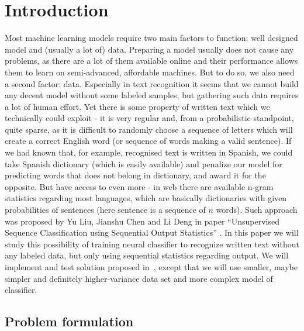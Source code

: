 \documentclass[shortabstract,lic,english]{iithesis}
\author         {Grzegorz Ciesielski}
\date          {}                     %
\begin{document}

\chapter{Introduction}

Most machine learning models require two main factors to function: well designed model and (usually a lot of) data. Preparing a model usually does not cause any problems, as there are a lot of them available online and their performance allows them to learn on semi-advanced, affordable machines. But to do so, we also need a second factor: data. Especially in text recognition it seems that we cannot build any decent model without some labeled samples, but gathering such data requires a lot of human effort. Yet there is some property of written text which we technically could exploit - it is very regular and, from a probabilistic standpoint, quite sparse, as it is difficult to randomly choose a sequence of letters which will create a correct English word (or sequence of words making a valid sentence). If we had known that, for example, recognised text is written in Spanish, we could take Spanish dictionary (which is easily available) and penalize our model for predicting words that does not belong in dictionary, and award it for the opposite. But have access to even more - in web there are available n-gram statistics regarding most languages, which are basically dictionaries with given probabilities of sentences (here sentence is a sequence of $n$ words). Such approach was proposed by Yu Liu, Jianshu Chen and Li Deng in paper ``Unsupervised Sequence Classification using Sequential Output Statistics'' \citep{liu2017unsupervised}. In this paper we will study this possibility of training neural classifier to recognize written text without any labeled data, but only using sequential statistics regarding output. We will implement and test solution proposed in~\citep{liu2017unsupervised}, except that we will use smaller, maybe simpler and definitely higher-variance data set and more complex model of classifier.

\section{Problem formulation}
\end{document}
